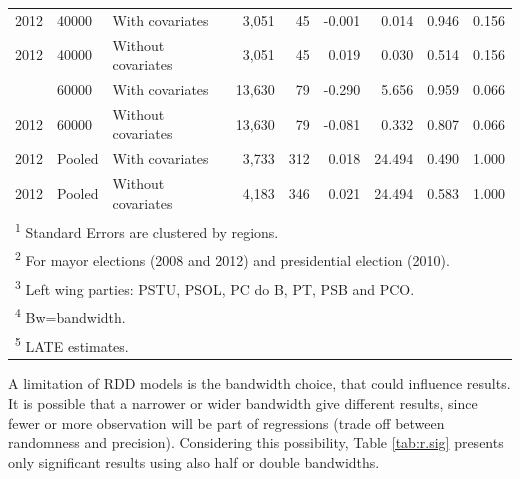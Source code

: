 \documentclass[12pt,]{article}
\begin{document}
\begin{table}[!h]
\begin{tabular}{lllrrrrrr}
2012 & 40000 & With covariates & 3,051 & 45 & -0.001 & 0.014 & 0.946 & 0.156\\
2012 & 40000 & Without covariates & 3,051 & 45 & 0.019 & 0.030 & 0.514 & 0.156\\
\addlinespace
2012 & 60000 & With covariates & 13,630 & 79 & -0.290 & 5.656 & 0.959 & 0.066\\
2012 & 60000 & Without covariates & 13,630 & 79 & -0.081 & 0.332 & 0.807 & 0.066\\
2012 & Pooled & With covariates & 3,733 & 312 & 0.018 & 24.494 & 0.490 & 1.000\\
2012 & Pooled & Without covariates & 4,183 & 346 & 0.021 & 24.494 & 0.583 & 1.000\\
\bottomrule
\multicolumn{9}{l}{\textsuperscript{1} Standard Errors are clustered by regions.}\\
\multicolumn{9}{l}{\textsuperscript{2} For mayor elections (2008 and 2012) and presidential election (2010).}\\
\multicolumn{9}{l}{\textsuperscript{3} Left wing parties: PSTU, PSOL, PC do B, PT, PSB and PCO.}\\
\multicolumn{9}{l}{\textsuperscript{4} Bw=bandwidth.}\\
\multicolumn{9}{l}{\textsuperscript{5} LATE estimates.}\\
\end{tabular}
\end{table}

A limitation of RDD models is the bandwidth choice, that could influence
results. It is possible that a narrower or wider bandwidth give
different results, since fewer or more observation will be part of
regressions (trade off between randomness and precision). Considering
this possibility, Table \ref{tab:r.sig} presents only significant
results using also half or double bandwidths.
\end{document}
